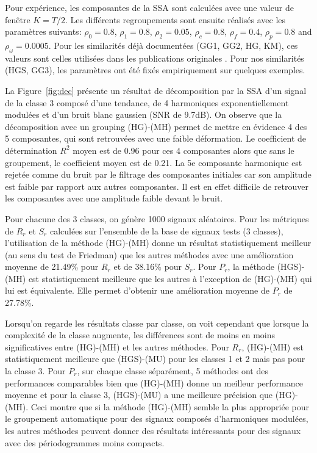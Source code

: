 \documentclass{gretsi}
\begin{document}
Pour expérience, les composantes de la SSA sont calculées avec une valeur de fenêtre $K=T/2$.
Les différents regroupements sont ensuite réalisés avec les paramètres suivants: $\rho_0=0.8$, $\rho_1=0.8$, $\rho_2=0.05$, $\rho_c=0.8$, $\rho_f=0.4$, $\rho_p=0.8$ and $\rho_\omega=0.0005$.
Pour les similarités déjà documentées (GG1, GG2, HG, KM), ces valeurs sont celles utilisées dans les publications originales \cite{abalov_14_auto, alvarez_13_auto}. Pour nos similarités (HGS, GG3), les paramètres ont été fixés empiriquement sur quelques exemples.



La Figure~\ref{fig:dec} présente un résultat de décomposition par la SSA d'un signal de la classe 3 composé d'une tendance, de 4 harmoniques exponentiellement modulées et d'un bruit blanc gaussien (SNR de 9.7dB).
On observe que la décomposition  avec un grouping (HG)-(MH) permet de mettre en évidence 4 des 5 composantes, qui sont retrouvées avec une faible déformation. 
Le coefficient de détermination $R^2$ moyen est de 0.96 pour ces 4 composantes alors que sans le groupement, le coefficient moyen est de 0.21.
La 5e composante harmonique est rejetée comme du bruit par le filtrage des composantes initiales car son amplitude est faible par rapport aux autres composantes.
Il est en effet difficile de retrouver les composantes avec une amplitude faible devant le bruit.


Pour chacune des 3 classes, on génère 1000 signaux aléatoires.
Pour les métriques de $R_r$ et $S_r$ calculées sur l'ensemble de la base de signaux tests (3 classes), l'utilisation de la méthode (HG)-(MH) donne un résultat statistiquement meilleur (au sens du test de Friedman) que les autres méthodes avec une amélioration moyenne de 21.49\% pour $R_r$ et de 38.16\% pour $S_r$.
Pour $P_r$, la méthode (HGS)-(MH) est statistiquement meilleure que les autres à l'exception de (HG)-(MH) qui lui est équivalente.
Elle permet d'obtenir une amélioration moyenne de $P_r$ de 27.78\%.


Lorsqu'on regarde les résultats classe par classe, on voit cependant que lorsque la complexité de la classe augmente, les différences sont de moins en moins significatives entre (HG)-(MH) et les autres méthodes.
Pour $R_r$, (HG)-(MH) est statistiquement meilleure que (HGS)-(MU) pour les classes 1 et 2 mais pas pour la classe 3.
Pour $P_r$, sur chaque classe séparément, 5 méthodes ont des performances comparables bien que (HG)-(MH) donne un meilleur performance moyenne et  pour la classe 3, (HGS)-(MU) a une meilleure précision que (HG)-(MH).
Ceci montre que si la méthode (HG)-(MH) semble la plus appropriée pour le groupement automatique pour des signaux composés d'harmoniques modulées, les autres méthodes peuvent donner des résultats intéressants pour des signaux avec des périodogrammes moins compacts.
\end{document}
